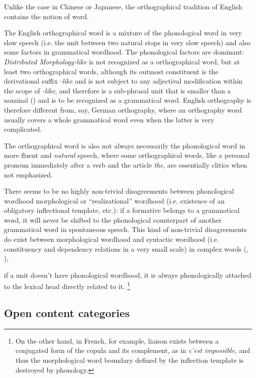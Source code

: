 \documentclass[UTF8, a4paper, oneside, scheme=plain, 12pt]{ctexbook}
\newcommand{\form}[1]{\emph{#1}}
\begin{document}
Unlike the case in Chinese or Japanese,
the orthographical tradition of English contains the notion of word.

The English orthographical word is 
a mixture of the phonological word in very slow speech
(i.e. the unit between two natural stops in very slow speech)
and also some factors in grammatical wordhood.
The phonological factors are dominant:
\form{Distributed Morphology-like} is not recognized as a orthographical word,
but at least two orthographical words,
although its outmost constituent is the derivational suffix \form{-like} 
and is not subject to any adjectival modification within the scope of \form{-like},
and therefore is a sub-phrasal unit  
that is smaller than a nominal ()
and is to be recognized as a grammatical word.
English orthography is therefore different from, say, 
German orthography,
where an orthography word usually covers a whole grammatical word 
even when the latter is very complicated.

The orthographical word is also not always necessarily the phonological word 
in more fluent and \emph{natural} speech, 
where some orthographical words, 
like a personal pronoun immediately after a verb 
and the article \form{the}, 
are essentially clitics when not emphasized.

There seems to be no highly non-trivial disagreements between 
phonological wordhood morphological or ``realizational'' wordhood 
(i.e. existence of an obligatory inflectional template, etc.):
if a formative belongs to a grammatical word, 
it will never be shifted to the phonological counterpart of another grammatical word
in spontaneous speech.
This kind of non-trivial disagreements do exist 
between morphological wordhood 
and syntactic wordhood 
(i.e. constituency and dependency relations in a very small scale) 
in complex words (,
), 


if a unit doesn't have phonological wordhood, 
it is always phonologically attached to the lexical head directly related to it.%
\footnote{
    On the other hand, in French, for example, 
    liaison exists between a conjugated form of the copula 
    and its complement, as in \form{c'est impossible}, 
    and thus the morphological word boundary defined by 
    the inflection template is destroyed by phonology. 
}


\subsection{Open content categories}
\end{document}
